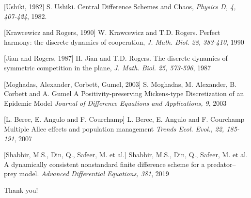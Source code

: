 \documentclass[xcolor={svgnames},hyperref={colorlinks,allcolors=Blue}]{beamer}
\begin{document}
\begin{thebibliography}{10}

[Ushiki, 1982]
S. Ushiki.
\newblock Central Difference Schemes and Chaos,
\newblock \emph{ Physics D, 4, 407-424}, 1982.

[Krawcewicz and Rogers, 1990]
W. Krawcewicz and T.D. Rogers.
\newblock Perfect harmony: the discrete dynamics of cooperation,
\newblock \emph{J. Math. Biol. 28, 383-410}, 1990

[Jian and Rogers, 1987]
H. Jian and T.D. Rogers.
\newblock The discrete dynamics of symmetric competition in the plane,
\newblock \emph{J. Math. Biol. 25, 573-596}, 1987

[Moghadas, Alexander, Corbett, Gumel, 2003]
S. Moghadas, M. Alexander, B. Corbett and A. Gumel
\newblock A Positivity-preserving Mickens-type Discretization of an Epidemic Model
\newblock \emph{Journal of Difference Equations and Applications, 9}, 2003

[L. Berec, E. Angulo and F. Courchamp]
L. Berec, E. Angulo and F. Courchamp
\newblock Multiple Allee effects and population management
\newblock \emph{Trends Ecol. Evol., 22, 185-191}, 2007

[Shabbir, M.S., Din, Q., Safeer, M. et al.]
Shabbir, M.S., Din, Q., Safeer, M. et al.
\newblock A dynamically consistent nonstandard finite difference scheme for a predator–prey model. 
\newblock \emph{Advanced Differential Equations, 381}, 2019

\end{thebibliography}

\begin{frame}

\begin{center}
Thank you!
\end{center}

\end{frame}

%
%
\end{document}
